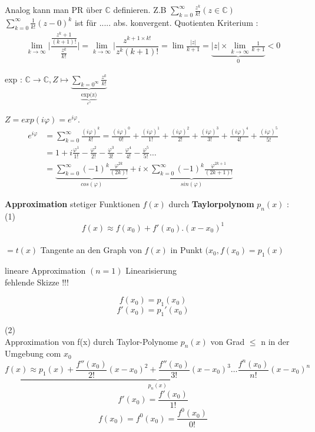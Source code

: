 \begin{remark}
Analog kann man PR über $\mathbb{C}$ definieren.
Z.B $\sum_{k=0}^{\infty}{\frac{z^k}{k!}}(z \in \mathbb{C})$ 
$\sum_{k=0}^{\infty}{\frac{1}{k!}(z-0)^k}$ ist für ..... abs. konvergent.
Quotienten Kriterium : 
\begin{align*}
\lim_{k \to \infty}{\bigg| \dfrac{\frac{z^k+1}{(k+1)!}}{\frac{z^k}{k!}}\bigg|} = \lim_{k \to \infty}{\bigg|\dfrac{z^{k+1 \times k!}}{z^k(k+1)!}} = \lim{\frac{|z|}{k+1}} = \underbrace{|z|\times \lim_{k \to \infty}{\frac{1}{k+1}}}_{0}<0
\end{align*} 

exp : $\mathbb{C} \rightarrow \mathbb{C} , Z \longmapsto  \underbrace{\sum_{k=0^{\infty}}{\frac{z^k}{k!}}}_{\underbrace{\text{exp(z)}}_{e^z}}$

$Z = exp(i \varphi)= e ^{i \varphi}$.
\begin{align*}
e ^{i \varphi} &= \sum_{k=0}^{\infty}{\frac{(i \varphi)^k}{k!}} = \frac{(i \varphi)^0}{0!} + \frac{(i \varphi)^1}{1!} + \frac{(i \varphi)^2}{2!} + \frac{(i \varphi)^3}{3!} + \frac{(i \varphi)^4}{4!} + \frac{(i \varphi)^5}{5!}\\
 &= 1 +  i \frac{\varphi^1}{1!} - \frac{\varphi^2}{2!} - \frac{\varphi^3}{3!} - \frac{\varphi^4}{4!} - \frac{\varphi^5}{5!} \dots \\
 &= \underbrace{\sum_{k=0}^{\infty}{(-1)^k \frac{\varphi^{2k}}{(2k)!}}}_{cos(\varphi)} + i \times \underbrace{\sum_{k=0}^{\infty}{(-1)^k \frac{\varphi^{2k+1}}{(2k+1)!}}}_{sin(\varphi)}
\end{align*}
\end{remark}
\textbf{Approximation} stetiger Funktionen $f(x)$ durch \textbf{Taylorpolynom} $p_n(x)$ :\\
(1) \\
$$f(x) \approx f(x_0)+f'(x_0).(x-x_0)^1$$\\
$= t(x)$ Tangente an den Graph von $f(x)$ in Punkt $(x_0 , f(x_0) = p_1(x)$
 
lineare Approximation $(n=1)$
Linearisierung\\
fehlende Skizze !!! 

\begin{remark}
\[ f(x_0)= p_1(x_0) \]
\[ f'(x_0)= p_1'(x_0) \]
\end{remark}

(2)\\
Approximation von f(x) durch Taylor-Polynome $p_n(x)$ von Grad $\leq$ n in der Umgebung com $x_0$
\[ \underbrace{f(x) \approx p_1(x) + 
\frac{f''(x_0)}{2!}(x-x_0)^2 +
\frac{f''(x_0)}{3!}(x-x_0)^3 \dots
\frac{f^n(x_0)}{n!}(x-x_0)^n}_{p_n(x)}\]
\[f'(x_0) = \frac{f'(x_0)}{1!} \]
\[f(x_0) = f^0(x_0) = \frac{f^0(x_0)}{0!}\]

